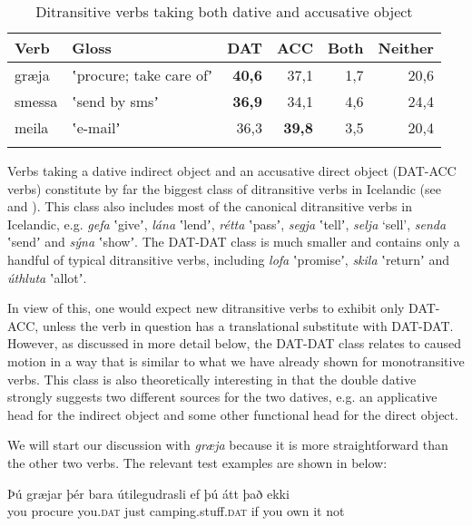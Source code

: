 \documentclass[output=paper,modfonts,nonflat,colorlinks,citecolor=brown]{langsci/langscibook}
\begin{document}
\begin{table}
{\caption{\label{tab:jonsson:5}Ditransitive verbs taking both dative and accusative object}}
\begin{tabularx}{\textwidth}{XXrrrr}
\lsptoprule
Verb & Gloss & DAT & ACC & Both & Neither\\
\midrule
græja & ʽprocure; take care ofʼ & \textbf{40,6} & 37,1 & 1,7 & 20,6\\
smessa & ʽsend by smsʼ & \textbf{36,9} & 34,1 & 4,6 & 24,4\\
meila & ʽe-mailʼ & 36,3 & \textbf{39,8} & 3,5 & 20,4\\
\lspbottomrule
\end{tabularx}
\end{table}

Verbs taking a dative indirect object and an accusative direct object (DAT-ACC verbs) constitute by far the biggest class of ditransitive verbs in Icelandic (see \citealt{ZaenenMalingThráinsson1985} and \citealt{Jónsson2000}). This class also includes most of the canonical ditransitive verbs in Icelandic, e.g. \textit{gefa} ʽgiveʼ, \textit{lána} ʽlendʼ, \textit{rétta} ʽpassʼ, \textit{segja} ʽtellʼ, \textit{selja} ‘sell’, \textit{senda} ʽsendʼ and \textit{sýna} ʽshowʼ. The DAT-DAT class is much smaller and contains only a handful of typical ditransitive verbs, including \textit{lofa} ʽpromiseʼ, \textit{skila} ʽreturnʼ and \textit{úthluta} ʽallotʼ.

In view of this, one would expect new ditransitive verbs to exhibit only DAT-ACC, unless the verb in question has a translational substitute with DAT-DAT. However, as discussed in more detail below, the DAT-DAT class relates to caused motion in a way that is similar to what we have already shown for monotransitive verbs. This class is also theoretically interesting in that the double dative strongly suggests two different sources for the two datives, e.g. an applicative head for the indirect object and some other functional head for the direct object.

We will start our discussion with \textit{græja} because it is more straightforward than the other two verbs. The relevant test examples are shown in  below:


\ea%
    \label{ex:jonsson:9}
\ea
\gll  Þú  græjar  þér  bara  útilegudrasli  ef  þú  átt  það  ekki\\
   you  procure  you.\textsc{dat}  just  camping.stuff.\textsc{dat}  if  you  own  it  not\\
\end{document}
